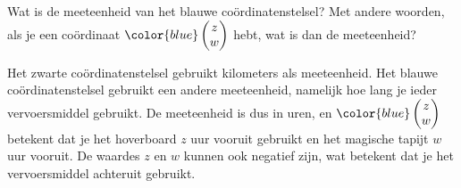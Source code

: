 \documentclass{ximera}
\begin{document}
\begin{exercise}
    Wat is de meeteenheid van het blauwe coördinatenstelsel? Met andere woorden, als je een coördinaat \(\color{blue}\begin{pmatrix} z \\ w \end{pmatrix}\) hebt, wat is dan de meeteenheid?
    \begin{oplossing}
        Het zwarte coördinatenstelsel gebruikt kilometers als meeteenheid.
        Het blauwe coördinatenstelsel gebruikt een andere meeteenheid, namelijk hoe lang je ieder vervoersmiddel gebruikt.
        De meeteenheid is dus in uren, en \(\color{blue}\begin{pmatrix} z \\ w \end{pmatrix}\) betekent dat je het hoverboard \(z\) uur vooruit gebruikt en het magische tapijt \(w\) uur vooruit.
        De waardes \(z\) en \(w\) kunnen ook negatief zijn, wat betekent dat je het vervoersmiddel achteruit gebruikt.
    \end{oplossing}
\end{exercise}
\end{document}
